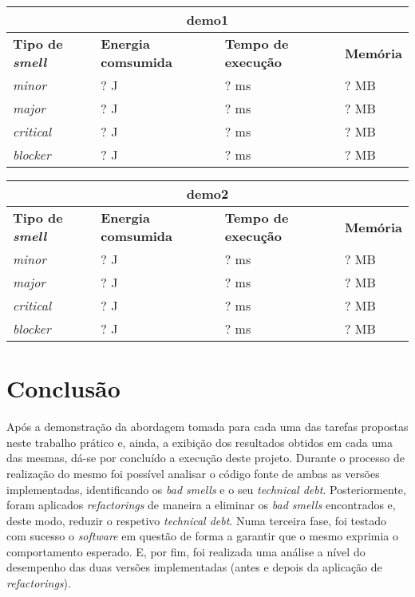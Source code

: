 \documentclass[a4paper]{report}
\begin{document}
\begin{center}
    \begin{tabular}{ | l | l | l | l | }
    \hline  
    \multicolumn{4}{|c|}{\textbf{demo1}} \\
    \hline
    \textbf{Tipo de \textit{smell}} & \textbf{Energia comsumida} & \textbf{Tempo de execução} & \textbf{Memória} \\ \hline
    \textit{minor} & ? J & ? ms & ? MB \\ \hline
    \textit{major} & ? J & ? ms & ? MB \\ \hline
    \textit{critical} & ? J & ? ms & ? MB \\ \hline
    \textit{blocker} & ? J & ? ms & ? MB \\ \hline
    \end{tabular}
\end{center}

\begin{center}
    \begin{tabular}{ | l | l | l | l | }
    \hline  
    \multicolumn{4}{|c|}{\textbf{demo2}} \\
    \hline
    \textbf{Tipo de \textit{smell}} & \textbf{Energia comsumida} & \textbf{Tempo de execução} & \textbf{Memória} \\ \hline
    \textit{minor} & ? J & ? ms & ? MB \\ \hline
    \textit{major} & ? J & ? ms & ? MB \\ \hline
    \textit{critical} & ? J & ? ms & ? MB \\ \hline
    \textit{blocker} & ? J & ? ms & ? MB \\ \hline
    \end{tabular}
\end{center}

\chapter{Conclusão}
Após a demonstração da abordagem tomada para cada uma das tarefas propostas neste trabalho prático e, ainda, a exibição dos resultados obtidos em cada uma das mesmas, dá-se por concluído a execução deste projeto. 
Durante o processo de realização do mesmo foi possível analisar o código fonte de ambas as versões implementadas, identificando os \textit{bad smells} e o seu \textit{technical debt}. Posteriormente, foram aplicados \textit{refactorings}
de maneira a eliminar os \textit{bad smells} encontrados e, deste modo, reduzir o respetivo \textit{technical debt}. Numa terceira fase, foi testado com sucesso o \textit{software} em questão de forma a garantir que o mesmo exprimia o 
comportamento esperado. E, por fim, foi realizada uma análise a nível do desempenho das duas versões implementadas (antes e depois da aplicação de \textit{refactorings}).
\end{document}
